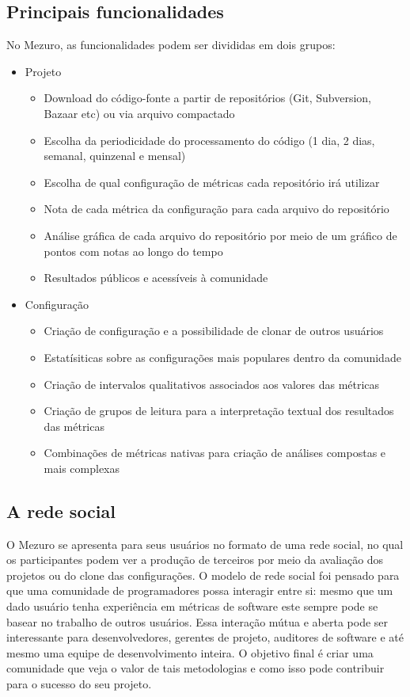 \documentclass[10pt]{article}
\begin{document}
  \subsection{Principais funcionalidades}\label{sec:princ-funcionalidades}
  No Mezuro, as funcionalidades podem ser divididas em dois grupos:
  \begin{itemize}
    \item Projeto
      \begin{itemize}
      \item Download do código-fonte a partir de repositórios (Git, Subversion, Bazaar etc) ou via arquivo compactado
          \item Escolha da periodicidade do processamento do código (1 dia, 2 dias, semanal, quinzenal e mensal)
          \item Escolha de qual configuração de métricas cada repositório irá utilizar
          \item Nota de cada métrica da configuração para cada arquivo do repositório
          \item Análise gráfica de cada arquivo do repositório por meio de um gráfico de pontos com notas ao longo do tempo
          \item Resultados públicos e acessíveis à comunidade
      \end{itemize}
      \item Configuração
      \begin{itemize}
      \item Criação de configuração e a possibilidade de clonar de outros usuários
          \item Estatísiticas sobre as configurações mais populares dentro da comunidade
          \item Criação de intervalos qualitativos associados aos valores das métricas
          \item Criação de grupos de leitura para a interpretação textual dos resultados das métricas
          \item Combinações de métricas nativas para criação de análises compostas e mais complexas
      \end{itemize}
  \end{itemize}
  \subsection{A rede social}\label{sec:user-potencial}
  O Mezuro se apresenta para seus usuários no formato de uma rede social, no qual os participantes podem ver a produção de terceiros por meio da avaliação dos projetos ou do clone das configurações. O modelo de rede social foi pensado para que uma comunidade de programadores possa interagir entre si: mesmo que um dado usuário tenha experiência em métricas de software este sempre pode se basear no trabalho de outros usuários. Essa interação mútua e aberta pode ser interessante para desenvolvedores, gerentes de projeto, auditores de software e até mesmo uma equipe de desenvolvimento inteira. O objetivo final é criar uma comunidade que veja o valor de tais metodologias e como isso pode contribuir para o sucesso do seu projeto.
\end{document}
